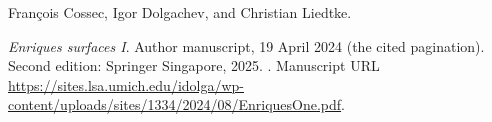 Fran\c{c}ois Cossec, Igor Dolgachev, and Christian Liedtke.

\newblock \emph{Enriques surfaces {I}}. Author manuscript, 19 April 2024
  (the cited pagination).
\newblock Second edition: Springer Singapore, 2025.
  .
\newblock Manuscript URL
  \url{https://sites.lsa.umich.edu/idolga/wp-content/uploads/sites/1334/2024/08/EnriquesOne.pdf}.

